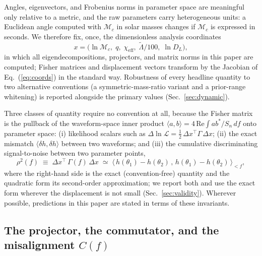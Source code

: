 \documentclass[twocolumn,prd,showpacs,superscriptaddress]{revtex4-2}
\newcommand{\inner}[2]{\langle #1, #2 \rangle}
\newcommand{\Mchirp}{\mathcal{M}_c}
\newcommand{\Lambdatilde}{\tilde{\Lambda}}
\newcommand{\chieff}{\chi_{\text{eff}}}
\newcommand{\Dl}{D_L}
\newcommand{\rhosq}{\rho^{2}}    %
\newcommand{\secref}[1]{Sec.~\ref{sec:#1}}
\newcommand{\eqnref}[1]{Eq.~(\ref{eq:#1})}
\begin{document}
Angles, eigenvectors, and Frobenius norms in parameter space are
meaningful only relative to a metric, and the raw parameters carry
heterogeneous units: a Euclidean angle computed with $\Mchirp$ in solar
masses changes if $\Mchirp$ is expressed in seconds.  We therefore fix,
once, the dimensionless analysis coordinates
\begin{equation}
x = \bigl(\ln \Mchirp,\; q,\; \chieff,\; \Lambdatilde/100,\; \ln \Dl\bigr),
\label{eq:coords}
\end{equation}
in which all eigendecompositions, projectors, and matrix norms in this
paper are computed; Fisher matrices and displacement vectors transform
by the Jacobian of \eqnref{coords} in the standard way.  Robustness of
every headline quantity to two alternative conventions (a
symmetric-mass-ratio variant and a prior-range whitening) is reported
alongside the primary values (\secref{dynamic}).

Three classes of quantity require no convention at all, because the
Fisher matrix is the pullback of the waveform-space inner product
$\inner{a}{b} = 4\,\mathrm{Re}\!\int a b^{*}/S_n\,df$ onto parameter
space: (i) likelihood scalars such as
$\Delta\ln\mathcal{L} = \tfrac12\,\Delta x^{\top}\Gamma\,\Delta x$;
(ii) the exact mismatch
$\inner{\delta h}{\delta h}$ between two waveforms; and (iii) the
cumulative discriminating signal-to-noise between two parameter points,
\begin{equation}
\rhosq(f) \;\equiv\; \Delta x^{\top}\,\Gamma(f)\,\Delta x
\;\simeq\; \inner{\,h(\theta_1)-h(\theta_2)\,}{\,h(\theta_1)-h(\theta_2)\,}_{<f},
\label{eq:rhosq}
\end{equation}
where the right-hand side is the exact (convention-free) quantity and
the quadratic form its second-order approximation; we report both and
use the exact form wherever the displacement is not small
(\secref{validity}).  Wherever possible, predictions in this paper are
stated in terms of these invariants.

\subsection{The projector, the commutator, and the misalignment $C(f)$}
\label{sec:commutator}
\end{document}
